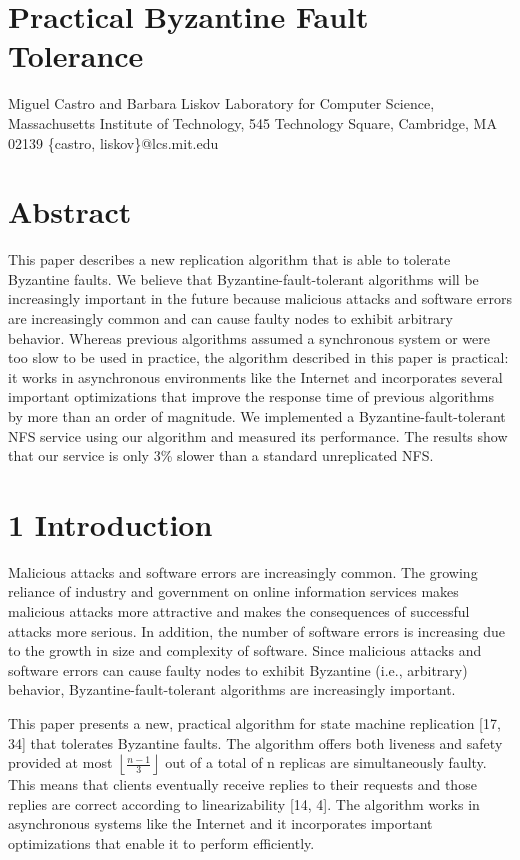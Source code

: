 \documentclass[
]{article}
\author{}
\date{}
\begin{document}
\section{Practical Byzantine Fault
Tolerance}\label{practical-byzantine-fault-tolerance}

Miguel Castro and Barbara Liskov Laboratory for Computer Science,
Massachusetts Institute of Technology, 545 Technology Square, Cambridge,
MA 02139 \{castro, liskov\}@lcs.mit.edu

\section{Abstract}\label{abstract}

This paper describes a new replication algorithm that is able to
tolerate Byzantine faults. We believe that Byzantine-fault-tolerant
algorithms will be increasingly important in the future because
malicious attacks and software errors are increasingly common and can
cause faulty nodes to exhibit arbitrary behavior. Whereas previous
algorithms assumed a synchronous system or were too slow to be used in
practice, the algorithm described in this paper is practical: it works
in asynchronous environments like the Internet and incorporates several
important optimizations that improve the response time of previous
algorithms by more than an order of magnitude. We implemented a
Byzantine-fault-tolerant NFS service using our algorithm and measured
its performance. The results show that our service is only 3\% slower
than a standard unreplicated NFS.

\section{1 Introduction}\label{introduction}

Malicious attacks and software errors are increasingly common. The
growing reliance of industry and government on online information
services makes malicious attacks more attractive and makes the
consequences of successful attacks more serious. In addition, the number
of software errors is increasing due to the growth in size and
complexity of software. Since malicious attacks and software errors can
cause faulty nodes to exhibit Byzantine (i.e., arbitrary) behavior,
Byzantine-fault-tolerant algorithms are increasingly important.

This paper presents a new, practical algorithm for state machine
replication {[}17, 34{]} that tolerates Byzantine faults. The algorithm
offers both liveness and safety provided at most
\(\left\lfloor\frac{n-1}{3}\right\rfloor\) out of a total of n replicas
are simultaneously faulty. This means that clients eventually receive
replies to their requests and those replies are correct according to
linearizability {[}14, 4{]}. The algorithm works in asynchronous systems
like the Internet and it incorporates important optimizations that
enable it to perform efficiently.
\end{document}
